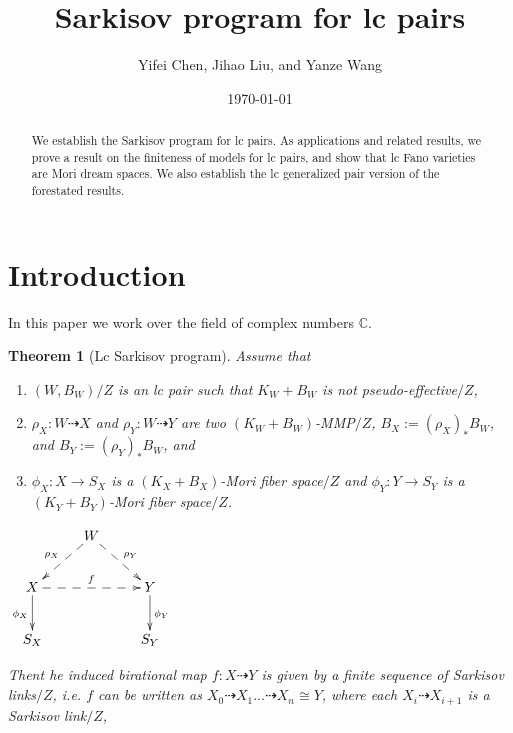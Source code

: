 \documentclass[11pt]{amsart}
\numberwithin{equation}{section}
\newtheorem{thm}{Theorem}[section]
\theoremstyle{definition}
\theoremstyle{definition}
\theoremstyle{definition}
\begin{document}
\title{Sarkisov program for lc pairs}
\author[Y. Chen, J. Liu, and Y. Wang]{Yifei Chen, Jihao Liu, and Yanze Wang}

\date{\today}


\address{Department of Mathematics, Northwestern University, 2033 Sheridan Rd, Evanston, IL 60208}




\begin{abstract}
We establish the Sarkisov program for lc pairs. As applications and related results, we prove a result on the finiteness of models for lc pairs, and show that lc Fano varieties are Mori dream spaces. We also establish the lc generalized pair version of the forestated results.
\end{abstract}

\maketitle
\pagestyle{myheadings}


\tableofcontents

\section{Introduction}
In this paper we work over the field of complex numbers $\mathbb C$.



\begin{thm}[Lc Sarkisov program]\label{thm: lc Sarkisov program}
Assume that
\begin{enumerate}
    \item $(W,B_W)/Z$ is an lc pair such that $K_W+B_W$ is not pseudo-effective$/Z$,
    \item $\rho_X: W\dashrightarrow X$ and $\rho_Y: W\dashrightarrow Y$ are two $(K_W+B_W)$-MMP$/Z$, $B_X:=(\rho_X)_*B_W$, and $B_Y:=(\rho_Y)_*B_W$, and
    \item $\phi_X: X\rightarrow S_X$ is a $(K_X+B_X)$-Mori fiber space$/Z$ and $\phi_Y: Y\rightarrow S_Y$ is a $(K_Y+B_Y)$-Mori fiber space$/Z$.
\end{enumerate}
\begin{center}$\xymatrix{
 & W\ar@{-->}[dl]_{\rho_X}\ar@{-->}[dr]^{\rho_Y}& \\
      X \ar@{->}[d]_{\phi_X}\ar@{-->}[rr]^{f}   &  & Y\ar@{->}[d]^{\phi_Y} \\
    S_X & &S_Y }$
\end{center}
Thent he induced birational map $f: X\dashrightarrow Y$ is given by a finite sequence of Sarkisov links$/Z$, i.e. $f$ can be written as $X_0\dashrightarrow X_1\dots\dashrightarrow X_n\cong Y$, where each $X_{i}\dashrightarrow X_{i+1}$ is a Sarkisov link$/Z$,
\end{thm}
\end{document}
